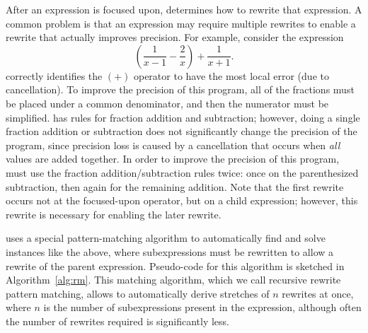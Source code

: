 \documentclass[paper.tex]{subfiles}
\begin{document}
After an expression is focused upon,
  \casio determines how to rewrite that expression.
A common problem is that an expression may require multiple rewrites
  to enable a rewrite that actually improves precision.
For example, consider the expression
\[
 \left(\frac{1}{x-1} - \frac{2}{x} \right) + \frac{1}{x+1}.
\]
\casio correctly identifies the $(+)$ operator
  to have the most local error (due to cancellation).
To improve the precision of this program,
  all of the fractions must be placed under a common denominator,
  and then the numerator must be simplified.
\casio has rules for fraction addition and subtraction;
  however, doing a single fraction addition or subtraction
  does not significantly change the precision of the program,
  since precision loss is caused by a cancellation
  that occurs when \emph{all} values are added together.
In order to improve the precision of this program,
  \casio must use the fraction addition/subtraction rules twice:
  once on the parenthesized subtraction,
  then again for the remaining addition.
Note that the first rewrite occurs not at the focused-upon operator,
  but on a child expression; however, this rewrite
  is necessary for enabling the later rewrite.

\casio uses a special pattern-matching algorithm
  to automatically find and solve instances like the above,
  where subexpressions must be rewritten
  to allow a rewrite of the parent expression.
Pseudo-code for this algorithm is sketched in Algorithm~\ref{alg:rm}.
This matching algorithm, which we call recursive rewrite pattern matching,
  allows \casio to automatically derive
  stretches of $n$ rewrites at once,
  where $n$ is the number of subexpressions present in the expression,
  although often the number of rewrites required is significantly less.
\end{document}
